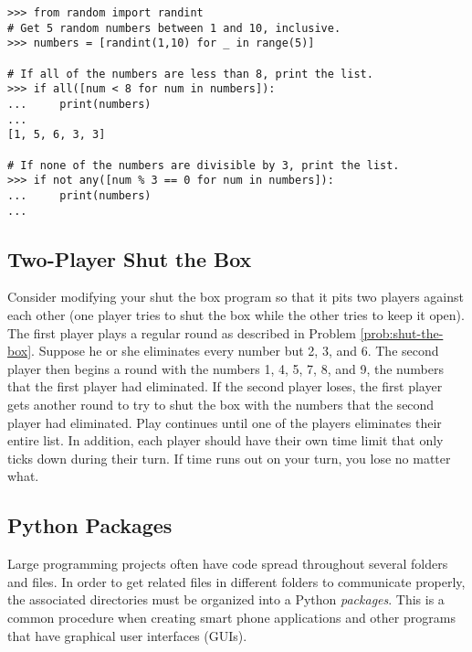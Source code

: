 \begin{lstlisting}
>>> from random import randint
# Get 5 random numbers between 1 and 10, inclusive.
>>> numbers = [randint(1,10) for _ in range(5)]

# If all of the numbers are less than 8, print the list.
>>> if all([num < 8 for num in numbers]):
...     print(numbers)
...
[1, 5, 6, 3, 3]

# If none of the numbers are divisible by 3, print the list.
>>> if not any([num % 3 == 0 for num in numbers]):
...     print(numbers)
...
\end{lstlisting}

\subsection*{Two-Player Shut the Box} %

Consider modifying your shut the box program so that it pits two players against each other (one player tries to shut the box while the other tries to keep it open).
The first player plays a regular round as described in Problem \ref{prob:shut-the-box}.
Suppose he or she eliminates every number but 2, 3, and 6.
The second player then begins a round with the numbers 1, 4, 5, 7, 8, and 9, the numbers that the first player had eliminated.
If the second player loses, the first player gets another round to try to shut the box with the numbers that the second player had eliminated.
Play continues until one of the players eliminates their entire list.
In addition, each player should have their own time limit that only ticks down during their turn.
If time runs out on your turn, you lose no matter what.

\subsection*{Python Packages} %

Large programming projects often have code spread throughout several folders and files.
In order to get related files in different folders to communicate properly, the associated directories must be organized into a Python \emph{packages}.
This is a common procedure when creating smart phone applications and other programs that have graphical user interfaces (GUIs).

